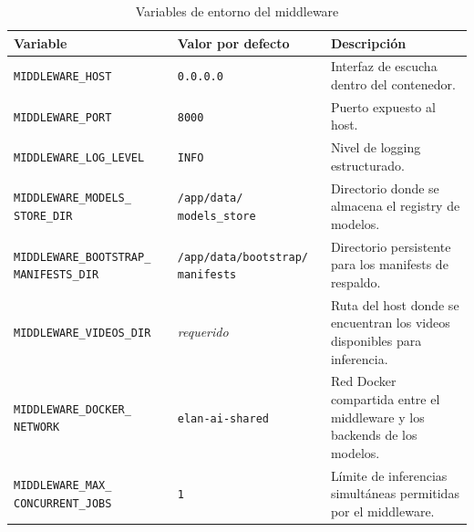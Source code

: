 \begin{table}[H]
\centering
\caption{Variables de entorno del middleware}
\label{tab:variables_entorno}
\scriptsize
\renewcommand{\arraystretch}{1.18}
\setlength{\tabcolsep}{5pt}

\begin{tabular}{
    >{\raggedright\arraybackslash}p{4.2cm}
    >{\raggedright\arraybackslash}p{3.4cm}
    >{\raggedright\arraybackslash}p{5.8cm}
}
\toprule
\textbf{Variable} & \textbf{Valor por defecto} & \textbf{Descripción} \\
\midrule

\texttt{MIDDLEWARE\_HOST} &
\texttt{0.0.0.0} &
Interfaz de escucha dentro del contenedor. \\

\texttt{MIDDLEWARE\_PORT} &
\texttt{8000} &
Puerto expuesto al host. \\

\texttt{MIDDLEWARE\_LOG\_LEVEL} &
\texttt{INFO} &
Nivel de logging estructurado. \\

\texttt{MIDDLEWARE\_MODELS\_}\newline
\texttt{STORE\_DIR} &
\texttt{/app/data/}\newline
\texttt{models\_store} &
Directorio donde se almacena el registry de modelos. \\

\texttt{MIDDLEWARE\_BOOTSTRAP\_}\newline
\texttt{MANIFESTS\_DIR} &
\texttt{/app/data/bootstrap/}\newline
\texttt{manifests} &
Directorio persistente para los manifests de respaldo. \\

\texttt{MIDDLEWARE\_VIDEOS\_DIR} &
\textit{requerido} &
Ruta del host donde se encuentran los videos disponibles para inferencia. \\

\texttt{MIDDLEWARE\_DOCKER\_}\newline
\texttt{NETWORK} &
\texttt{elan-ai-shared} &
Red Docker compartida entre el middleware y los backends de los modelos. \\

\texttt{MIDDLEWARE\_MAX\_}\newline
\texttt{CONCURRENT\_JOBS} &
\texttt{1} &
Límite de inferencias simultáneas permitidas por el middleware. \\

\bottomrule
\end{tabular}
\end{table}


